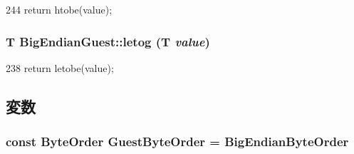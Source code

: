 \begin{DoxyCode}
244 {return htobe(value);}
\end{DoxyCode}
\hypertarget{namespaceBigEndianGuest_a245baef980523bf81f2285b1fa3e74b8}{
\subsubsection[{letog}]{\setlength{\rightskip}{0pt plus 5cm}T BigEndianGuest::letog (T {\em value})}}
\label{namespaceBigEndianGuest_a245baef980523bf81f2285b1fa3e74b8}



\begin{DoxyCode}
238 {return letobe(value);}
\end{DoxyCode}


\subsection{変数}
\hypertarget{namespaceBigEndianGuest_aef5e34cb4383d2b11025693e07673656}{
\subsubsection[{GuestByteOrder}]{\setlength{\rightskip}{0pt plus 5cm}const {\bf ByteOrder} {\bf GuestByteOrder} = BigEndianByteOrder}}
\label{namespaceBigEndianGuest_aef5e34cb4383d2b11025693e07673656}
